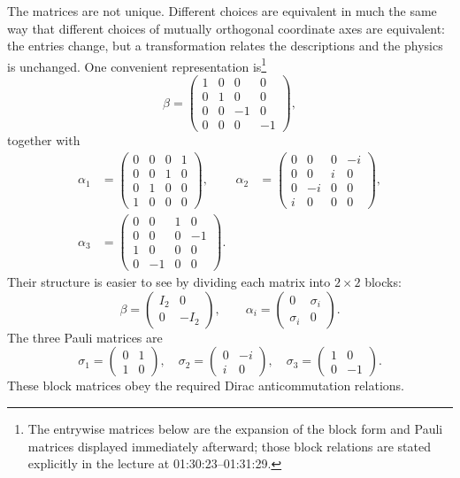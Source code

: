 The matrices are not unique. Different choices are equivalent in much the same way that different choices of mutually orthogonal coordinate axes are equivalent: the entries change, but a transformation relates the descriptions and the physics is unchanged. One convenient representation is\footnote{The entrywise matrices below are the expansion of the block form and Pauli matrices displayed immediately afterward; those block relations are stated explicitly in the lecture at 01:30:23--01:31:29.}
\begin{equation}
\beta=
\begin{pmatrix}
1&0&0&0\\
0&1&0&0\\
0&0&-1&0\\
0&0&0&-1
\end{pmatrix},
\end{equation}
together with
\begin{align}
\alpha_1&=
\begin{pmatrix}
0&0&0&1\\
0&0&1&0\\
0&1&0&0\\
1&0&0&0
\end{pmatrix},
&
\alpha_2&=
\begin{pmatrix}
0&0&0&-i\\
0&0&i&0\\
0&-i&0&0\\
i&0&0&0
\end{pmatrix},
\\[1ex]
\alpha_3&=
\begin{pmatrix}
0&0&1&0\\
0&0&0&-1\\
1&0&0&0\\
0&-1&0&0
\end{pmatrix}.
\end{align}
Their structure is easier to see by dividing each matrix into \(2\times2\) blocks:
\begin{equation}
\beta=
\begin{pmatrix}
I_2&0\\
0&-I_2
\end{pmatrix},
\qquad
\alpha_i=
\begin{pmatrix}
0&\sigma_i\\
\sigma_i&0
\end{pmatrix}.
\end{equation}
The three Pauli matrices are
\begin{equation}
\sigma_1=
\begin{pmatrix}
0&1\\
1&0
\end{pmatrix},
\quad
\sigma_2=
\begin{pmatrix}
0&-i\\
i&0
\end{pmatrix},
\quad
\sigma_3=
\begin{pmatrix}
1&0\\
0&-1
\end{pmatrix}.
\end{equation}
These block matrices obey the required Dirac anticommutation relations.


